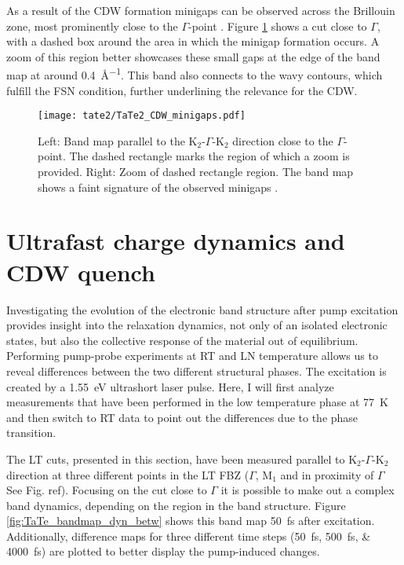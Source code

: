 As a result of the CDW formation minigaps can be observed across the Brillouin zone, most prominently close to the $\Gamma$-point \cite{lin_evidence_2022}.
Figure \ref{fig:TaTe_minigaps} shows a cut close to $\Gamma$, with a dashed box around the area in which the minigap formation occurs.
A zoom of this region better showcases these small gaps at the edge of the band map at around \qty{0.4}{\angstrom^{-1}}.
This band also connects to the wavy contours, which fulfill the FSN condition, further underlining the relevance for the CDW.

\begin{figure}[h!]
	\centering
	\texttt{[image: tate2/TaTe2\_CDW\_minigaps.pdf]}
	\caption{Left: Band map parallel to the K$_2$-$\Gamma$-K$_2$ direction close to the $\Gamma$-point. The dashed rectangle marks the region of which a zoom is provided. Right: Zoom of dashed rectangle region. The band map shows a faint signature of the observed minigaps \cite{lin_evidence_2022}.}
	\label{fig:TaTe_minigaps}
\end{figure}

\section{Ultrafast charge dynamics and CDW quench}

Investigating the evolution of the electronic band structure after pump excitation provides insight into the relaxation dynamics, not only of an isolated electronic states, but also the collective response of the material out of equilibrium.
Performing pump-probe experiments at RT and LN temperature allows us to reveal differences between the two different structural phases.
The excitation is created by a \qty{1.55}{\electronvolt} ultrashort laser pulse.
Here, I will first analyze measurements that have been performed in the low temperature phase at \qty{77}{\kelvin} and then switch to RT data to point out the differences due to the phase transition.

The LT cuts, presented in this section, have been measured parallel to K$_2$-$\Gamma$-K$_2$ direction at three different points in the LT FBZ ($\Gamma$, M$_1$ and in proximity of $\Gamma$ See Fig. ref).
Focusing on the cut close to $\Gamma$ it is possible to make out a complex band dynamics, depending on the region in the band structure.
Figure \ref{fig:TaTe_bandmap_dyn_betw} shows this band map \qty{50}{\femto\second} after excitation.
Additionally, difference maps for three different time steps (\qtylist{50; 500; 4000}{\femto\second}) are plotted to better display the pump-induced changes.


